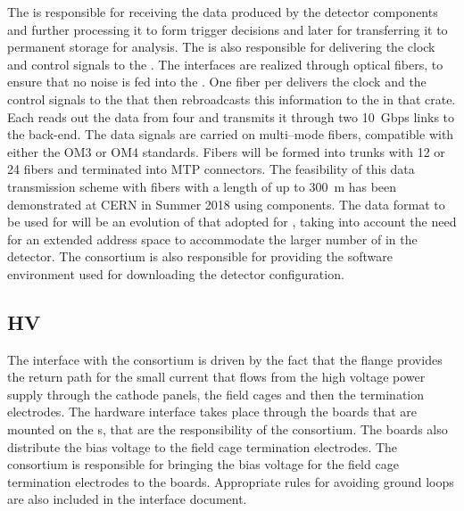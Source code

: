 The  is responsible for receiving the data produced by the
 detector components and further processing it to
form trigger decisions and later for transferring it to 
permanent storage for analysis. The 
 is also responsible for delivering the clock and control
signals to the . The interfaces are realized 
through optical fibers, to ensure that no noise is fed into
the . One fiber per  delivers the
clock and the control signals to the  that then
rebroadcasts this information to the  in that 
crate. Each  reads out the data from four 
and transmits it through two 10~Gbps links to the  back-end.
The data signals are carried on multi--mode fibers, compatible with 
either the OM3 or OM4 standards. Fibers will be formed into trunks with 
12 or 24 fibers and terminated into MTP connectors. The feasibility
of this data transmission scheme with fibers with a length of up
to \SI{300}{m} has been demonstrated at CERN in Summer 2018 using 
 components. The data format to be used for 
 will be an evolution of that adopted for
, taking into account the need for an 
extended address space to accommodate the larger number of
 in the detector. The  consortium
is also responsible for providing the software environment
used for downloading the detector configuration.

\subsection{HV}
\label{sec:fdsp-tpcelec-interfaces-hv}

The interface with the  consortium
is driven by the fact that the  flange provides the return path for
the small current that flows from the high voltage power 
supply through the cathode panels, the field cages and then
the termination electrodes. The hardware interface takes place through
the  boards that are mounted on the s, that
are  the responsibility of the  consortium. The
 boards also distribute the bias voltage to the field
cage termination electrodes. The  consortium
is responsible for bringing the bias voltage for the field
cage termination electrodes to the  boards. Appropriate
rules for avoiding ground loops are also included in the 
interface document.

